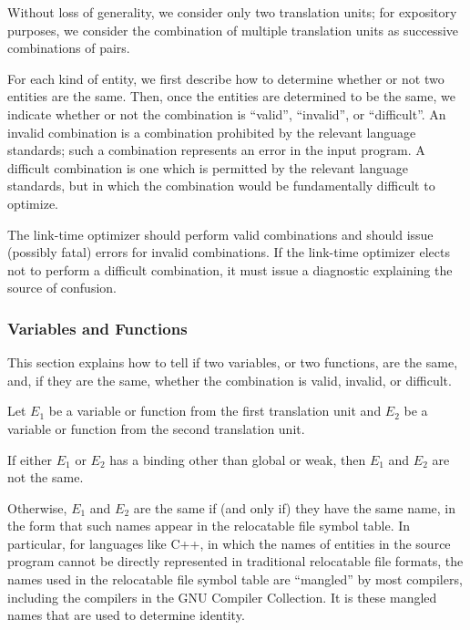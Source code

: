 Without loss of generality, we consider only two translation units;
for expository purposes, we consider the combination of multiple
translation units as successive combinations of pairs.

For each kind of entity, we first describe how to determine whether or
not two entities are the same.  Then, once the entities are determined
to be the same, we indicate whether or not the combination is ``valid'',
``invalid'', or ``difficult''.  An invalid combination is a combination
prohibited by the relevant language standards; such a combination
represents an error in the input program.  A difficult combination is
one which is permitted by the relevant language standards, but in
which the combination would be fundamentally difficult to optimize.

\begin{requirement}
 \label{req:combs}
 The link-time optimizer should perform valid combinations and should
 issue (possibly fatal) errors for invalid combinations.  If the
 link-time optimizer elects not to perform a difficult combination, it
 must issue a diagnostic explaining the source of confusion.
\end{requirement}

\subsubsection{Variables and Functions}

This section explains how to tell if two variables, or two functions,
are the same, and, if they are the same, whether the combination is
valid, invalid, or difficult.

Let $E_1$ be a variable or function from the first translation unit and
$E_2$ be a variable or function from the second translation unit.

If either $E_1$ or $E_2$ has a binding other than global or weak, then
$E_1$ and $E_2$ are not the same.

Otherwise, $E_1$ and $E_2$ are the same if (and only if) they have the
same name, in the form that such names appear in the relocatable file
symbol table.  In particular, for languages like C++, in which the
names of entities in the source program cannot be directly represented
in traditional relocatable file formats, the names used in the
relocatable file symbol table are ``mangled'' by most compilers,
including the compilers in the GNU Compiler Collection.  It is these
mangled names that are used to determine identity.

